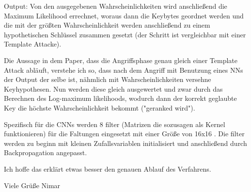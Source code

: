 Output:
Von den ausgegebenen Wahrscheinlichkeiten wird anschließend die Maximum Likelihood errechnet, woraus dann die Keybytes geordnet werden und die mit der größten Wahrscheinlichkeit werden anschließend zu einem hypothetischen Schlüssel zusammen gesetzt (der Schritt ist vergleichbar mit einer Template Attacke).

Die Aussage in dem Paper, dass die Angriffsphase genau gleich einer Template Attack abläuft, verstehe ich so, dass nach dem Angriff mit Benutzung eines NNs der Output der selbe ist, nähmlich mit Wahrscheinlichkeiten versehne Keyhypothesen. Nun werden diese gleich ausgewertet und zwar durch das Berechnen des Log-maximum likelihoods, wodurch dann der korrekt geglaubte Key die höchste Wahrscheinlichkeit bekommt ("geranked wird").

Spezifisch für die CNNs werden 8 filter (Matrizen die sozusagen als Kernel funktionieren) für die Faltungen eingesetzt mit einer Größe von 16x16 . Die filter werden zu beginn mit kleinen Zufallsvariablen initialisiert und anschließend durch Backpropagation angepasst. 

Ich hoffe das erklärt etwas besser den genauen Ablauf des Verfahrens.

Viele Grüße
Nimar

